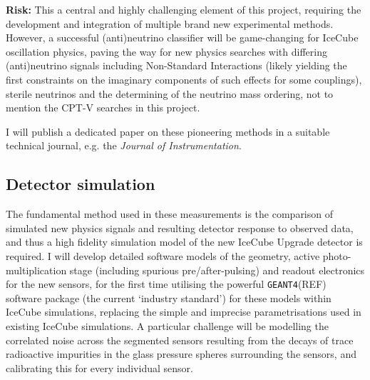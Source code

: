 \documentclass[a4paper,11pt]{article}
\begin{document}
\textbf{Risk:} This a central and highly challenging element of this project, requiring the development and integration of multiple brand new experimental methods. However, a successful (anti)neutrino classifier will be game-changing for IceCube oscillation physics, paving the way for new physics searches with differing (anti)neutrino signals including Non-Standard Interactions (likely yielding the first constraints on the imaginary components of such effects for some couplings), sterile neutrinos and the determining of the neutrino mass ordering, not to mention the CPT-V searches in this project. 

I will publish a dedicated paper on these pioneering methods in a suitable technical journal, e.g. the \textit{Journal of Instrumentation}. \\








\subsection{Detector simulation}

The fundamental method used in these measurements is the comparison of simulated new physics signals and resulting detector response to observed data, and thus a high fidelity simulation model of the new IceCube Upgrade detector is required. I will develop detailed software models of the geometry, active photo-multiplication stage (including spurious pre/after-pulsing) and readout electronics for the new sensors, for the first time utilising the powerful \texttt{GEANT4}(REF) software package (the current `industry standard') for these models within IceCube simulations, replacing the simple and imprecise parametrisations used in existing IceCube simulations. A particular challenge will be modelling the correlated noise across the segmented sensors resulting from the decays of trace radioactive impurities in the glass pressure spheres surrounding the sensors, and calibrating this for every individual sensor. 
\end{document}
